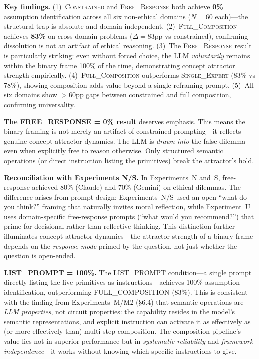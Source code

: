 \documentclass[11pt,a4paper]{article}
\begin{document}
\textbf{Key findings.} (1)~\textsc{Constrained} and \textsc{Free\_Response} both achieve \textbf{0\%} assumption identification across all six non-ethical domains ($N=60$ each)---the structural trap is absolute and domain-independent. (2)~\textsc{Full\_Composition} achieves \textbf{83\%} on cross-domain problems ($\Delta = 83$pp vs constrained), confirming dissolution is not an artifact of ethical reasoning. (3)~The \textsc{Free\_Response} result is particularly striking: even without forced choice, the LLM \emph{voluntarily} remains within the binary frame 100\% of the time, demonstrating concept attractor strength empirically. (4)~\textsc{Full\_Composition} outperforms \textsc{Single\_Expert} (83\% vs 78\%), showing composition adds value beyond a single reframing prompt. (5)~All six domains show $>$60pp gaps between constrained and full composition, confirming universality.

\textbf{The FREE\_RESPONSE = 0\% result} deserves emphasis. This means the binary framing is not merely an artifact of constrained prompting---it reflects genuine concept attractor dynamics. The LLM is \emph{drawn into} the false dilemma even when explicitly free to reason otherwise. Only structured semantic operations (or direct instruction listing the primitives) break the attractor's hold.

\textbf{Reconciliation with Experiments N/S.} In Experiments~N and~S, free-response achieved 80\% (Claude) and 70\% (Gemini) on ethical dilemmas. The difference arises from prompt design: Experiments~N/S used an open ``what do you think?'' framing that naturally invites moral reflection, while Experiment~U uses domain-specific free-response prompts (``what would you recommend?'') that prime for decisional rather than reflective thinking. This distinction further illuminates concept attractor dynamics---the attractor strength of a binary frame depends on the \emph{response mode} primed by the question, not just whether the question is open-ended.

\textbf{LIST\_PROMPT = 100\%.} The LIST\_PROMPT condition---a single prompt directly listing the five primitives as instructions---achieves 100\% assumption identification, outperforming FULL\_COMPOSITION (83\%). This is consistent with the finding from Experiments~M/M2 (\S6.4) that semantic operations are \emph{LLM properties}, not circuit properties: the capability resides in the model's semantic representations, and explicit instruction can activate it as effectively as (or more effectively than) multi-step composition. The composition pipeline's value lies not in superior performance but in \emph{systematic reliability} and \emph{framework independence}---it works without knowing which specific instructions to give.
\end{document}
